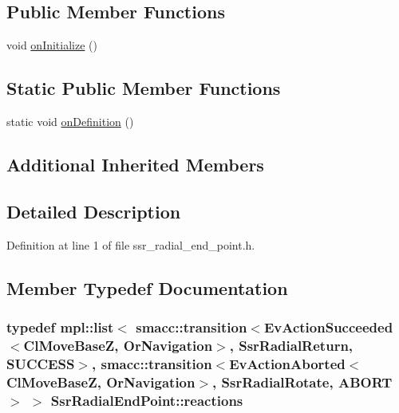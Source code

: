 \subsection*{Public Member Functions}
\begin{DoxyCompactItemize}
\item 
void \hyperlink{structSsrRadialEndPoint_a193b193a7a831dcdf586686c0c309f73}{on\+Initialize} ()
\end{DoxyCompactItemize}
\subsection*{Static Public Member Functions}
\begin{DoxyCompactItemize}
\item 
static void \hyperlink{structSsrRadialEndPoint_a99cb9ca368254cff94843a32d791bd6c}{on\+Definition} ()
\end{DoxyCompactItemize}
\subsection*{Additional Inherited Members}


\subsection{Detailed Description}


Definition at line 1 of file ssr\+\_\+radial\+\_\+end\+\_\+point.\+h.



\subsection{Member Typedef Documentation}
\subsubsection[{\texorpdfstring{reactions}{reactions}}]{\setlength{\rightskip}{0pt plus 5cm}typedef mpl\+::list$<$ {\bf smacc\+::transition}$<$Ev\+Action\+Succeeded$<$Cl\+Move\+BaseZ, Or\+Navigation$>$, {\bf Ssr\+Radial\+Return}, {\bf S\+U\+C\+C\+E\+SS}$>$, {\bf smacc\+::transition}$<$Ev\+Action\+Aborted$<$Cl\+Move\+BaseZ, Or\+Navigation$>$, {\bf Ssr\+Radial\+Rotate}, {\bf A\+B\+O\+RT}$>$ $>$ {\bf Ssr\+Radial\+End\+Point\+::reactions}}\hypertarget{structSsrRadialEndPoint_ae7b83b9a03aa9f567f7ce318ef856bf1}{}\label{structSsrRadialEndPoint_ae7b83b9a03aa9f567f7ce318ef856bf1}


